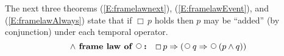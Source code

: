 \documentclass[12pt, fleqn, leqno]{article}
\newcommand{\lgap}{2pt}                             %
\newcommand{\mymathindent}{24pt}                    %
\newcommand{\equivs}{\ensuremath{\;\equiv\;}}       %
\newcommand{\impl}{\ensuremath{\Rightarrow}}        %
\newcommand{\foll}{\ensuremath{\Leftarrow}}         %
\newcommand{\Next}{\;\,\text{\raisebox{3.5pt}{\circle{6}}}}
\newcommand{\Event}{\Diamond\,}
\newcommand{\Always}{\Box\,}
\newcommand{\myqed}{\rule[-.23ex]{1.2ex}{2.0ex}}
\newcommand{\myqedtab}{\hspace{384pt}}              %
\newcommand{\Gll} {\langle}                         %
\newcommand{\Ggg} {\rangle}                         %
\newcommand{\Hint}[1]     {\ \ \ $\Gll              \mbox{#1} \Ggg$ }   %
\begin{document}

The next three theorems
(\ref{E:framelawnext}),
(\ref{E:framelawEvent}),
and
(\ref{E:framelawAlways})
state that if $\Always p$ holds then $p$ may be ``added''
(by conjunction) under each temporal operator. \cite{Kroger}
\begin{equation}\label{E:framelawnext}
\textbf{$\land$ frame law of $\Next$:}\quad \Always p \impl (\Next q \impl \Next (p \land q))
\end{equation}
\end{document}
